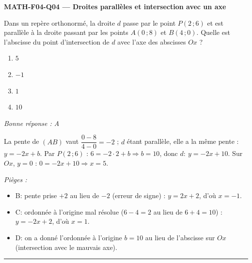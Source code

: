\documentclass[11pt,a4paper]{article}
\begin{document}
\noindent\textbf{MATH-F04-Q04 --- Droites parallèles et intersection avec un axe}\par
Dans un repère orthonormé, la droite $d$ passe par le point $P(2\,;6)$ et est parallèle à la droite passant par les points $A(0\,;8)$ et $B(4\,;0)$. Quelle est l'abscisse du point d'intersection de $d$ avec l'axe des abscisses $Ox$ ?
\begin{enumerate}[label=\Alph*)]
\item $5$
\item $-1$
\item $1$
\item $10$
\end{enumerate}
\textit{Bonne réponse : A}\par
La pente de $(AB)$ vaut $\dfrac{0-8}{4-0}=-2$ ; $d$ étant parallèle, elle a la même pente : $y=-2x+b$. Par $P(2\,;6)$ : $6=-2\cdot 2+b\Rightarrow b=10$, donc $d:\ y=-2x+10$. Sur $Ox$, $y=0$ : $0=-2x+10\Rightarrow x=5$.\par
\textit{Pièges :}
\begin{itemize}
\item B: pente prise $+2$ au lieu de $-2$ (erreur de signe) : $y=2x+2$, d'où $x=-1$.
\item C: ordonnée à l'origine mal résolue ($6-4=2$ au lieu de $6+4=10$) : $y=-2x+2$, d'où $x=1$.
\item D: on a donné l'ordonnée à l'origine $b=10$ au lieu de l'abscisse sur $Ox$ (intersection avec le mauvais axe).
\end{itemize}
\vspace{8pt}\hrule\vspace{8pt}
\end{document}
